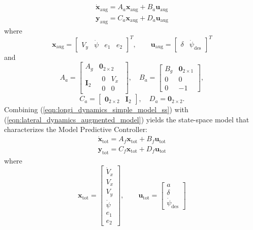 \documentclass[conference, 11pt]{IEEEtran}
\begin{document}
\begin{equation}
\label{eqn:lateral_dynamics_augmented_model}
\begin{array}{ll}
\dot{\textbf{x}}_{\text{aug}} =A_a \textbf{x}_{\text{aug}}+ B_a \textbf{u}_{\text{aug}}\\
\textbf{y}_{\text{aug}} =C_a \textbf{x}_{\text{aug}} + D_a \textbf{u}_{\text{aug}}
\end{array}
\end{equation}
where
\begin{equation*}
\textbf{x}_{\text{aug}} = \begin{bmatrix}
V_y&\dot{\psi}&e_1&e_2
\end{bmatrix}^T,
\qquad
\textbf{u}_{\text{aug}} = 
\begin{bmatrix}
\delta&\dot{\psi}_{\text{des}}
\end{bmatrix}^T
\end{equation*}
and
\[ 
A_a=\begin{bmatrix}
A_g&\textbf{0}_{2\times2}\\
\textbf{I}_2&\begin{matrix}
0&V_x\\
0&0
\end{matrix}
\end{bmatrix},
\quad
B_a=\begin{bmatrix}
B_g&\textbf{0}_{2\times1}\\
0&0\\
0&-1
\end{bmatrix},
\]
\[
C_a=\begin{bmatrix}
\textbf{0}_{2\times2}&\textbf{I}_2
\end{bmatrix}, 
\quad
D_a=
\textbf{0}_{2\times2}. 
\]
Combining (\ref{eqn:longi_dynamics_simple_model_ss}) with (\ref{eqn:lateral_dynamics_augmented_model}) yields the state-space model that characterizes the Model Predictive Controller:
\begin{equation}
\label{eqn:full_dynamics_model}
\begin{array}{ll}
\dot{\textbf{x}}_{\text{tot}} =A_f \textbf{x}_{\text{tot}}+ B_f \textbf{u}_{\text{tot}}\\
\textbf{y}_{\text{tot}} =C_f \textbf{x}_{\text{tot}} + D_f \textbf{u}_{\text{tot}}
\end{array}
\end{equation}
where
\begin{equation*}
\textbf{x}_{\text{tot}} = \begin{bmatrix}
\dot{V}_x\\V_x\\V_y\\\dot{\psi}\\e_1\\e_2
\end{bmatrix},
\qquad
\textbf{u}_{\text{tot}} = 
\begin{bmatrix}
a\\\delta\\\dot{\psi}_{\text{des}}
\end{bmatrix}
\end{equation*}
\end{document}
